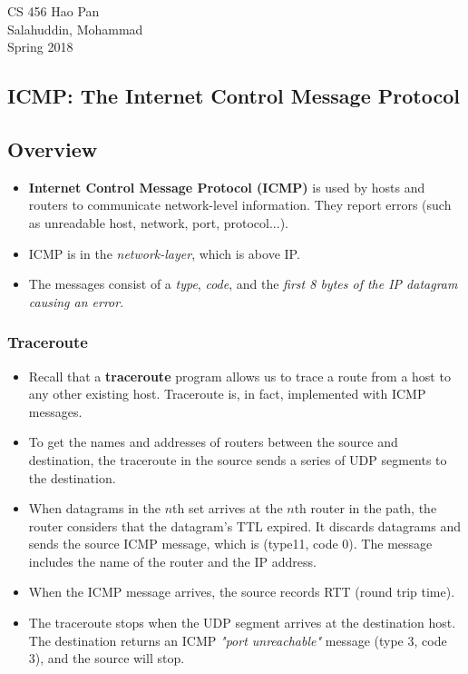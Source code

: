 \documentclass{article}
\begin{document}
\noindent
{CS 456 \hfill Hao Pan}\\
{Salahuddin, Mohammad}\\
{Spring 2018}


\begin{center}
\section{ICMP: The Internet Control Message Protocol}
\noindent
\end{center}

\subsection{Overview}

\begin{itemize}
\item {\bf Internet Control Message Protocol (ICMP)} is used by hosts and routers to communicate network-level information. They report errors (such as unreadable host, network, port, protocol...).
\item ICMP is in the \emph{network-layer}, which is above IP.
\item The messages consist of a \emph{type}, \emph{code}, and the \emph{first 8 bytes of the IP datagram causing an error}.
\end{itemize}

\subsubsection{Traceroute}
\begin{itemize}
\item Recall that a {\bf traceroute} program allows us to trace a route from a host to any other existing host. Traceroute is, in fact, implemented with ICMP messages.
\item To get the names and addresses of routers between the source and destination, the traceroute in the source sends a series of UDP segments to the destination.
\item When datagrams in the $n$th set arrives at the $n$th router in the path, the router considers that the datagram's TTL expired. It discards datagrams and sends the source ICMP message, which is (type11, code 0). The message includes the name of the router and the IP address.
\item When the ICMP message arrives, the source records RTT (round trip time).
\item The traceroute stops when the UDP segment arrives at the destination host. The destination returns an ICMP \emph{"port unreachable"} message (type 3, code 3), and the source will stop.
\end{itemize}
\end{document}
